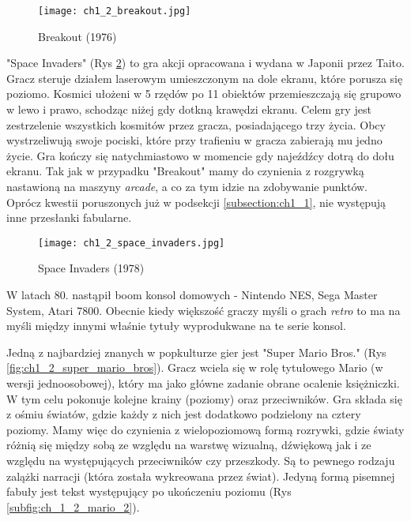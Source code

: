\begin{figure}[h]
    \centering
    \texttt{[image: ch1\_2\_breakout.jpg]}
    \caption{Breakout (1976)}
    \label{fig:ch1_2_breakout}
\end{figure}

"Space Invaders" (Rys \ref{fig:ch1_2_space_invaders}) to gra akcji opracowana i wydana w Japonii przez Taito. Gracz steruje działem laserowym
umieszczonym na dole ekranu, które porusza się poziomo. Kosmici ułożeni w 5 rzędów po 11 obiektów
przemieszczają się grupowo w lewo i prawo, schodząc niżej gdy dotkną krawędzi ekranu. Celem gry jest
zestrzelenie wszystkich kosmitów przez gracza, posiadającego trzy życia. Obcy wystrzeliwują swoje pociski,
które przy trafieniu w gracza zabierają mu jedno życie. Gra kończy się natychmiastowo w momencie gdy
najeźdźcy dotrą do dołu ekranu. Tak jak w przypadku "Breakout" mamy do czynienia z rozgrywką nastawioną na
maszyny \textit{arcade}, a co za tym idzie na zdobywanie punktów. Oprócz kwestii poruszonych już w
podsekcji \ref{subsection:ch1_1}, nie występują inne przesłanki fabularne.

\begin{figure}[h]
    \centering
    \texttt{[image: ch1\_2\_space\_invaders.jpg]}
    \caption{Space Invaders (1978)}
    \label{fig:ch1_2_space_invaders}
\end{figure}

\newpage

W latach 80. nastąpił boom konsol domowych - Nintendo NES, Sega Master System, Atari 7800\cite{the_evolution_of_video_games}.
Obecnie kiedy większość graczy myśli o grach \textit{retro} to ma na myśli między innymi właśnie tytuły
wyprodukwane na te serie konsol.

Jedną z najbardziej znanych w popkulturze gier jest "Super Mario Bros." (Rys \ref{fig:ch1_2_super_mario_bros}).
Gracz wciela się w rolę tytułowego Mario (w wersji jednoosobowej), który ma jako główne zadanie obrane
ocalenie księżniczki. W tym celu pokonuje kolejne krainy (poziomy) oraz przeciwników. Gra składa się z ośmiu
światów, gdzie każdy z nich jest dodatkowo podzielony na cztery poziomy. Mamy więc do czynienia z
wielopoziomową formą rozrywki, gdzie światy różnią się między sobą ze względu na warstwę wizualną, dźwiękową
jak i ze względu na występujących przeciwników czy przeszkody. Są to pewnego rodzaju zalążki narracji
(która została wykreowana przez świat). Jedyną formą pisemnej fabuły jest tekst występujący po ukończeniu
poziomu (Rys \ref{subfig:ch_1_2_mario_2}).

